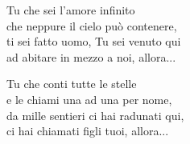 

\spazio

\strofa Tu che sei l'amore infinito\\
che neppure il cielo può contenere,\\
ti sei fatto uomo, Tu sei venuto qui\\
ad abitare in mezzo a noi, allora...

\spazio


\spazio

\strofa Tu che conti tutte le stelle\\
e le chiami una ad una per nome,\\
da mille sentieri ci hai radunati qui,\\
ci hai chiamati figli tuoi, allora...

\spazio

